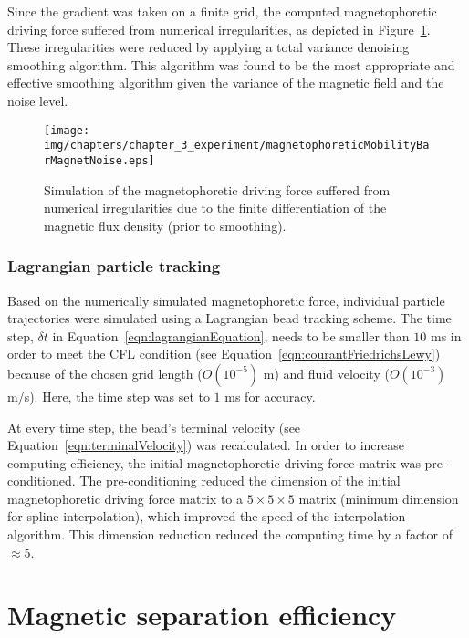 Since the gradient was taken on a finite grid, the computed magnetophoretic driving force suffered from numerical irregularities, as depicted in Figure~\ref{fig:magnetophoreticMobilityBarMagnetNoise}. These irregularities were reduced by applying a total variance denoising smoothing algorithm. This algorithm was found to be the most appropriate and effective smoothing algorithm given the variance of the magnetic field and the noise level.

\begin{figure}[htb]
        \centering
        \texttt{[image: img/chapters/chapter\_3\_experiment/magnetophoreticMobilityBarMagnetNoise.eps]}
        \caption[Noisy numerical magnetophoretic driving force]{Simulation of the magnetophoretic driving force suffered from numerical irregularities due to the finite differentiation of the magnetic flux density (prior to smoothing).}
        \label{fig:magnetophoreticMobilityBarMagnetNoise}
\end{figure}

\subsubsection{Lagrangian particle tracking}\label{subsubsec:discreteParticleSimulations}
Based on the numerically simulated magnetophoretic force, individual particle trajectories were simulated using a Lagrangian bead tracking scheme. The time step, $\delta t$ in Equation~\ref{eqn:lagrangianEquation}, needs to be smaller than $10$ ms in order to meet the CFL condition (see Equation~\ref{eqn:courantFriedrichsLewy}) because of the chosen grid length ($O(10^{-5})$ m) and fluid velocity ($O(10^{-3})$ m/s). Here, the time step was set to $1$ ms for accuracy. 

At every time step, the bead's terminal velocity (see Equation~\ref{eqn:terminalVelocity}) was recalculated. In order to increase computing efficiency, the initial magnetophoretic driving force matrix was pre-conditioned. The pre-conditioning reduced the dimension of the initial magnetophoretic driving force matrix to a $5\times5\times5$ matrix (minimum dimension for spline interpolation), which improved the speed of the interpolation algorithm. This dimension reduction reduced the computing time by a factor of $\approx 5$.

\section{Magnetic separation efficiency}\label{sec:magneticSeparationEfficiency}
